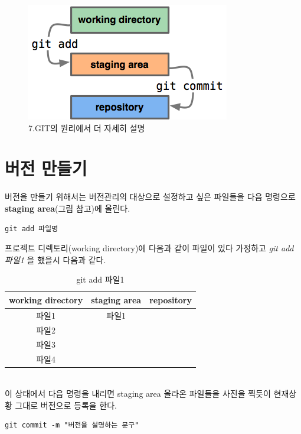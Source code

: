 \documentclass[letterpaper,12pt]{article}
\begin{document}
\begin{figure}[ht] 
        \centering \includegraphics[width=0.8\columnwidth]{git}
         \caption{
                \label{fig:git}  
                7.GIT의 원리에서 더 자세히 설명
        }
\end{figure}

\section{버전 만들기}
버전을 만들기 위해서는 버전관리의 대상으로 설정하고 싶은 파일들을 다음 명령으로 \textbf{staging area}(그림 참고)에 올린다.
\begin{verbatim}
git add 파일명
\end{verbatim}
프로젝트 디렉토리(working directory)에 다음과 같이 파일이 있다 가정하고 \textit{git add 파일1} 을 했을시 다음과 같다.
\begin{table}[ht]
\begin{center}
\label{tbl:bins} %
\begin{tabular}{|ccc|} 
\hline
\multicolumn{1}{|c}{working directory} & \multicolumn{1}{c}{staging area} & repository\\
\hline
파일1 &   파일1 & \\
파일2 &    & \\
파일3 &    & \\
파일4 &    & \\
\hline
\end{tabular}
\end{center}
\caption{git add 파일1}
\end{table}
\\이 상태에서 다음 명령을 내리면 staging area 올라온 파일들을 사진을 찍듯이 현재상황 그대로 버전으로 등록을 한다. 
\begin{verbatim}
git commit -m "버전을 설명하는 문구"
\end{verbatim}
\end{document}
